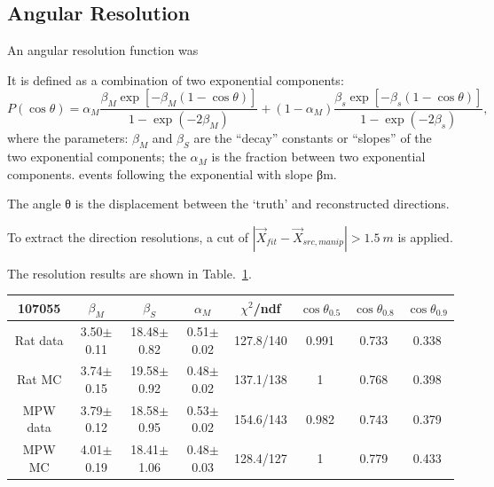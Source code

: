 \subsection{Angular Resolution}
An angular resolution function was 

It is defined as a combination of two exponential components:
\begin{equation}
P(\cos\theta)=\alpha_M\frac{\beta_M\exp[-\beta_M(1-\cos\theta)]}{1-\exp(-2\beta_M)}+(1-\alpha_M)\frac{\beta_s\exp[-\beta_s(1-\cos\theta)]}{1-\exp(-2\beta_s)},
\end{equation}
where the parameters: $\beta_M$ and $\beta_S$ are the ``decay'' constants or ``slopes'' of the two exponential components; the $\alpha_M$ is the fraction between two exponential components.
events following the exponential with slope βm. 


The angle θ is the displacement between the ‘truth’ and
reconstructed directions.

To extract the direction resolutions, a cut of $|\vec{X}_{fit}-\vec{X}_{src,manip}|>1.5~m$ is applied.

The resolution results are shown in Table.~\ref{angularResolValues}.
\begin{table}[ht]
	\begin{tabular}{cccccccc}%
		\toprule
		107055& $\beta_M$ &  $\beta_S$ & $\alpha_M$ & $\chi^2$/ndf & $\cos\theta_{0.5}$ & $\cos\theta_{0.8}$& $\cos\theta_{0.9}$\\
		\hline
		Rat data & 3.50$\pm$0.11 & 18.48$\pm$0.82 & 0.51$\pm$0.02 & 127.8/140 & 0.991 & 0.733 & 0.338\\
		Rat MC  & 3.74$\pm$0.15 & 19.58$\pm$0.92 & 0.48$\pm$0.02 & 137.1/138 & 1 & 0.768 & 0.398\\	
		\hline
		MPW data & 3.79$\pm$0.12 & 18.58$\pm$0.95 & 0.53$\pm$0.02 & 154.6/143 & 0.982 & 0.743 & 0.379\\
		MPW MC &4.01$\pm$0.19 & 18.41$\pm$1.06 & 0.48$\pm$0.03 & 128.4/127 & 1 & 0.779 & 0.433  \\
		\bottomrule
	\end{tabular}
	\label{angularResolValues}
\end{table}


